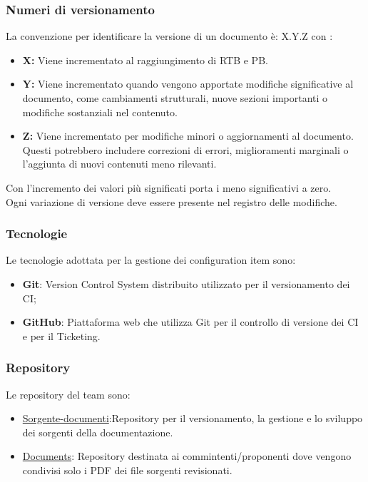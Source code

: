 \documentclass{article}
\begin{document}
\subsubsection{Numeri di versionamento}\label{sec:versionamento}
 La convenzione per identificare la versione di un documento è: X.Y.Z
con :
\begin{itemize}
\item \textbf{X: }Viene incrementato al raggiungimento di RTB e PB.
 \item \textbf{Y: }Viene incrementato quando vengono apportate modifiche significative al documento, come cambiamenti strutturali, nuove sezioni importanti o modifiche sostanziali nel contenuto.
 \item \textbf{Z: }Viene incrementato per modifiche minori o aggiornamenti al documento. Questi potrebbero includere correzioni di errori, miglioramenti marginali o l'aggiunta di nuovi contenuti meno rilevanti.
\end{itemize}

Con l'incremento dei valori più significati  porta i meno significativi a zero. \\
Ogni variazione di versione deve essere presente nel registro delle modifiche.
\subsubsection{Tecnologie}
Le tecnologie adottata per la gestione dei configuration item sono:
\begin{itemize}
    \item \textbf{Git}: Version Control System distribuito utilizzato per il versionamento dei CI;
    \item \textbf{GitHub}: Piattaforma web che utilizza Git per il controllo di versione dei CI e per il Ticketing.
\end{itemize}

\subsubsection{Repository}
Le repository del team sono:
    \begin{itemize}
        \item \href{https://github.com/ByteOps-swe/Sorgente-documenti}{Sorgente-documenti}:Repository per il versionamento, la gestione e lo sviluppo dei sorgenti della documentazione.
        \item \href{https://github.com/ByteOps-swe/Documents}{Documents}: Repository destinata ai commintenti/proponenti dove vengono condivisi solo i PDF dei file sorgenti revisionati.  
    \end{itemize}
\end{document}
